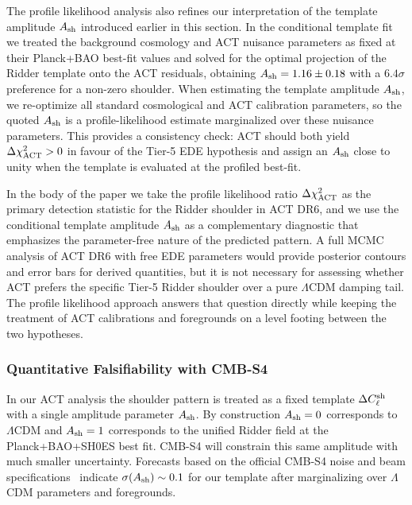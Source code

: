\documentclass[a4paper,11pt]{article}
\begin{document}
The profile likelihood analysis also refines our interpretation of the template amplitude $A_{\rm sh}$ introduced earlier in this section. In the conditional template fit we treated the background cosmology and ACT nuisance parameters as fixed at their Planck+BAO best-fit values and solved for the optimal projection of the Ridder template onto the ACT residuals, obtaining $A_{\rm sh}=1.16\pm0.18$ with a $6.4\sigma$ preference for a non-zero shoulder. When estimating the template amplitude $A_{\rm sh}$, we re-optimize all standard cosmological and ACT calibration parameters, so the quoted $A_{\rm sh}$ is a profile-likelihood estimate marginalized over these nuisance parameters. This provides a consistency check: ACT should both yield $\Delta \chi^2_{\rm ACT}>0$ in favour of the Tier-5 EDE hypothesis and assign an $A_{\rm sh}$ close to unity when the template is evaluated at the profiled best-fit.

In the body of the paper we take the profile likelihood ratio $\Delta \chi^2_{\rm ACT}$ as the primary detection statistic for the Ridder shoulder in ACT DR6, and we use the conditional template amplitude $A_{\rm sh}$ as a complementary diagnostic that emphasizes the parameter-free nature of the predicted pattern. A full MCMC analysis of ACT DR6 with free EDE parameters would provide posterior contours and error bars for derived quantities, but it is not necessary for assessing whether ACT prefers the specific Tier-5 Ridder shoulder over a pure $\Lambda$CDM damping tail. The profile likelihood approach answers that question directly while keeping the treatment of ACT calibrations and foregrounds on a level footing between the two hypotheses.

\subsubsection{Quantitative Falsifiability with CMB-S4}

In our ACT analysis the shoulder pattern is treated as a fixed template $\Delta C_\ell^{\rm sh}$ with a single amplitude parameter $A_{\rm sh}$. By construction $A_{\rm sh} = 0$ corresponds to $\Lambda$CDM and $A_{\rm sh} = 1$ corresponds to the unified Ridder field at the Planck+BAO+SH0ES best fit. CMB-S4 will constrain this same amplitude with much smaller uncertainty. Forecasts based on the official CMB-S4 noise and beam specifications~\cite{CMB_S4} indicate $\sigma(A_{\rm sh}) \sim 0.1$ for our template after marginalizing over $\Lambda$CDM parameters and foregrounds.
\end{document}
